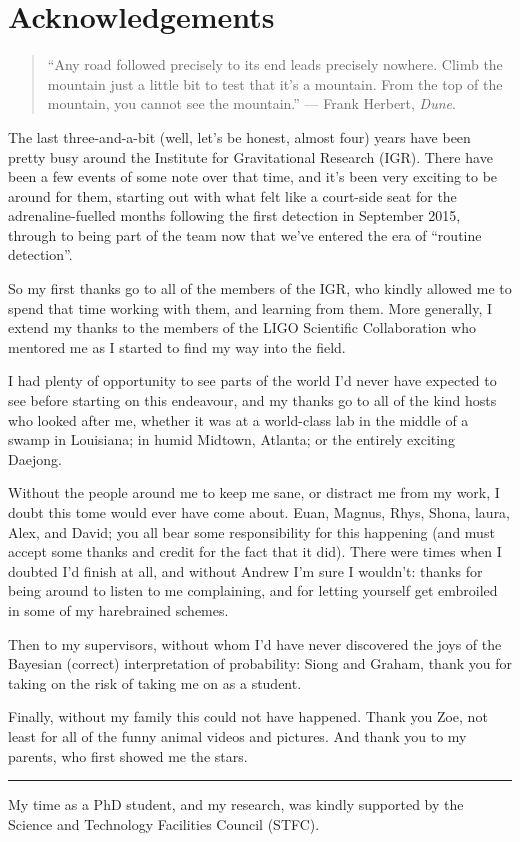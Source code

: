 \section{Acknowledgements}
\label{sec-1}
\begin{quote}
``Any road followed precisely to its end leads precisely nowhere. Climb the mountain just a little bit to test that it's a mountain. From the top of the mountain, you cannot see the mountain.'' --- Frank Herbert, \emph{Dune}.
\end{quote}

The last three-and-a-bit (well, let's be honest, almost four) years have been pretty busy around the Institute for Gravitational Research (IGR).
There have been a few events of some note over that time, and it's been very exciting to be around for them, starting out with what felt like a court-side seat for the adrenaline-fuelled months following the first detection in September 2015, through to being part of the team now that we've entered the era of ``routine detection''.

So my first thanks go to all of the members of the IGR, who kindly allowed me to spend that time working with them, and learning from them.
More generally, I extend my thanks to the members of the LIGO Scientific Collaboration who mentored me as I started to find my way into the field.

I had plenty of opportunity to see parts of the world I'd never have expected to see before starting on this endeavour, and my thanks go to all of the kind hosts who looked after me, whether it was at a world-class lab in the middle of a swamp in Louisiana; in humid Midtown, Atlanta; or the entirely exciting Daejong.

Without the people around me to keep me sane, or distract me from my work, I doubt this tome would ever have come about. 
Euan, Magnus, Rhys, Shona, laura, Alex, and David; you all bear some responsibility for this happening (and must accept some thanks and credit for the fact that it did). 
There were times when I doubted I'd finish at all, and without Andrew I'm sure I wouldn't: thanks for being around to listen to me complaining, and for letting yourself get embroiled in some of my harebrained schemes.

Then to my supervisors, without whom I'd have never discovered the joys of the Bayesian (correct) interpretation of probability: Siong and Graham, thank you for taking on the risk of taking me on as a student.

Finally, without my family this could not have happened.
Thank you Zoe, not least for all of the funny animal videos and pictures.
And thank you to my parents, who first showed me the stars.

\rule{\linewidth}{0.5pt}

My time as a PhD student, and my research, was kindly supported by the Science and Technology Facilities Council (STFC).
